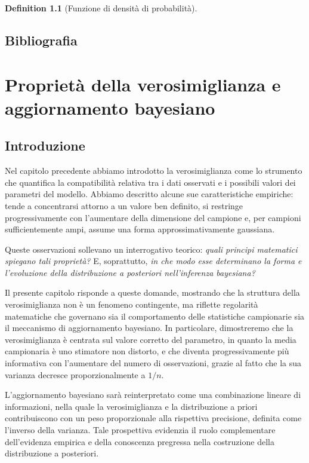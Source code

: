 \documentclass[
  letterpaper,
  DIV=11,
  numbers=noendperiod,
  oneside]{scrreprt}
\theoremstyle{definition}
\theoremstyle{plain}
\theoremstyle{definition}
\newtheorem{definition}{Definition}[chapter]
\theoremstyle{remark}
\begin{document}
\begin{definition}[Funzione di densità di
probabilità]
\section*{Bibliografia}\label{bibliografia-10}


\chapter{Proprietà della verosimiglianza e aggiornamento
bayesiano}\label{sec-likelihood-properties}

\section*{Introduzione}\label{introduzione-14}


Nel capitolo precedente abbiamo introdotto la verosimiglianza come lo
strumento che quantifica la compatibilità relativa tra i dati osservati
e i possibili valori dei parametri del modello. Abbiamo descritto alcune
sue caratteristiche empiriche: tende a concentrarsi attorno a un valore
ben definito, si restringe progressivamente con l'aumentare della
dimensione del campione e, per campioni sufficientemente ampi, assume
una forma approssimativamente gaussiana.

Queste osservazioni sollevano un interrogativo teorico: \emph{quali
principi matematici spiegano tali proprietà?} E, soprattutto, \emph{in
che modo esse determinano la forma e l'evoluzione della distribuzione a
posteriori nell'inferenza bayesiana?}

Il presente capitolo risponde a queste domande, mostrando che la
struttura della verosimiglianza non è un fenomeno contingente, ma
riflette regolarità matematiche che governano sia il comportamento delle
statistiche campionarie sia il meccanismo di aggiornamento bayesiano. In
particolare, dimostreremo che la verosimiglianza è centrata sul valore
corretto del parametro, in quanto la media campionaria è uno stimatore
non distorto, e che diventa progressivamente più informativa con
l'aumentare del numero di osservazioni, grazie al fatto che la sua
varianza decresce proporzionalmente a \(1/n\).

L'aggiornamento bayesiano sarà reinterpretato come una combinazione
lineare di informazioni, nella quale la verosimiglianza e la
distribuzione a priori contribuiscono con un peso proporzionale alla
rispettiva precisione, definita come l'inverso della varianza. Tale
prospettiva evidenzia il ruolo complementare dell'evidenza empirica e
della conoscenza pregressa nella costruzione della distribuzione a
posteriori.


\end{definition}
\end{document}
